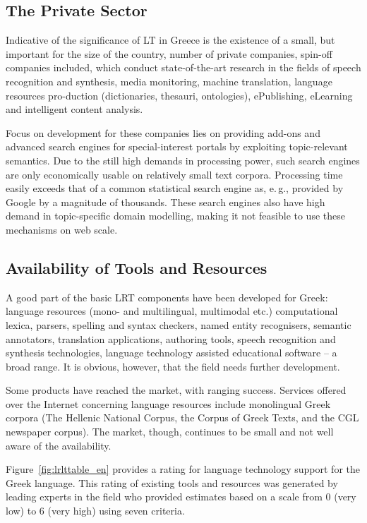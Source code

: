 \begin{multicols}{2}
\subsection{The Private Sector}

Indicative of the significance of LT in Greece is the existence of a small, but important for the size of the country, number of private companies, spin-off companies included, which conduct state-of-the-art research in the fields of speech recognition and synthesis, media monitoring, machine translation, language resources pro-duction (dictionaries, thesauri, ontologies), ePublishing, eLearning and intelligent content analysis.

Focus on development for these companies lies on providing add-ons and advanced search engines for special-interest portals by exploiting topic-relevant semantics. Due to the still high demands in processing power, such search engines are only economically usable on relatively small text corpora. Processing time easily exceeds that of a common statistical search engine as, e.\,g., provided by Google by a magnitude of thousands. These search engines also have high demand in topic-specific domain modelling, making it not feasible to use these mechanisms on web scale.

\subsection{Availability of Tools and Resources}

A good part of the basic LRT components have been developed for Greek: language resources (mono- and multilingual, multimodal etc.) computational lexica, parsers, spelling and syntax checkers, named entity recognisers, semantic annotators, translation applications, authoring tools, speech recognition and synthesis technologies, language technology assisted educational software -- a broad range. It is obvious, however, that the field needs further development.

Some products have reached the market, with ranging success. Services offered over the Internet concerning language resources include monolingual Greek corpora (The Hellenic National Corpus, the Corpus of Greek Texts, and the CGL newspaper corpus). The market, though, continues to be small and not well aware of the availability.

Figure~\ref{fig:lrlttable_en} provides a rating for language technology support for the Greek language. This rating of existing tools and resources was generated by leading experts in the field who provided estimates based on a scale from 0 (very low) to 6 (very high) using seven criteria.


\end{multicols}
